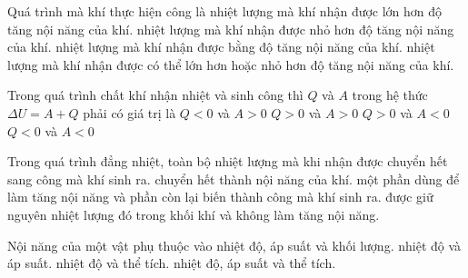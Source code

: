 \begin{ex}
Quá trình mà khí thực hiện công là
\choice
{\True nhiệt lượng mà khí nhận được lớn hơn độ tăng nội năng của khí.}
{nhiệt lượng mà khí nhận được nhỏ hơn độ tăng nội năng của khí.}
{nhiệt lượng mà khí nhận được bằng độ tăng nội năng của khí.}
{nhiệt lượng mà khí nhận được có thể lớn hơn hoặc nhỏ hơn độ tăng nội năng của khí.}
\end{ex}

\begin{ex}
Trong quá trình chất khí nhận nhiệt và sinh công thì $Q$ và $A$ trong hệ thức $\Delta U = A + Q$ phải có giá trị là
\choice
{$Q < 0$ và $A > 0$}
{$Q > 0$ và $A > 0$}
{\True $Q > 0$ và $A < 0$}
{$Q < 0$ và $A < 0$}
\end{ex}

\begin{ex}
Trong quá trình đẳng nhiệt, toàn bộ nhiệt lượng mà khi nhận được
\choice
{\True chuyển hết sang công mà khí sinh ra.}
{chuyển hết thành nội năng của khí.}
{một phần dùng để làm tăng nội năng và phần còn lại biến thành công mà khí sinh ra.}
{được giữ nguyên nhiệt lượng đó trong khối khí và không làm tăng nội năng.}
\end{ex}

\begin{ex}
Nội năng của một vật phụ thuộc vào
\choice
{nhiệt độ, áp suất và khối lượng.}
{nhiệt độ và áp suất.}
{\True nhiệt độ và thể tích.}
{nhiệt độ, áp suất và thể tích.}
\end{ex}


